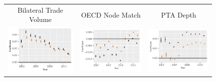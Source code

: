 \documentclass[reqno,onecolumn,letterpaper,12pt]{article}
\begin{document}
\begin{figure}[!h]
\begin{tabular}{@{\hskip -.05cm}c@{\hskip -.2cm}c@{\hskip -.2cm}c}
Bilateral Trade Volume&
OECD Node Match &
PTA Depth \\


\includegraphics[height=.165\textheight, clip=true, trim=.5cm .5cm 0cm .1cm]{figures/main_rl_plots/Trade_Volume.pdf} &
\includegraphics[height=.165\textheight, clip=true, trim=.5cm .5cm 0cm .1cm]{figures/main_rl_plots/Nodematch_OECD.pdf}    &
\includegraphics[height=.165\textheight, clip=true, trim=.5cm .5cm 0cm .1cm]{figures/main_rl_plots/PTA_Depth.pdf}    \\


\end{tabular}
\end{figure}
\end{document}
